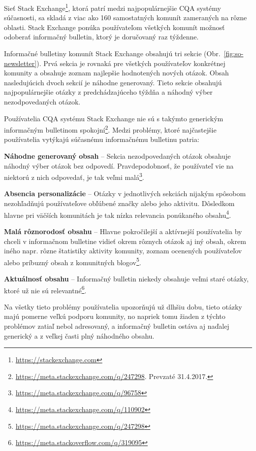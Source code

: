 Sieť Stack Exchange\footnote{ \url{https://stackexchange.com}}, ktorá patrí medzi najpopulárnejšie CQA systémy súčasnosti,
sa skladá z viac ako 160 samostatných komunít zameraných na rôzne oblasti. Stack Exchange ponúka používateľom všetkých
komunít možnosť odoberať informačný bulletin, ktorý je doručovaný raz týždenne.

Informačné bulletiny komunít Stack Exchange obsahujú tri sekcie (Obr.~\ref{fig:so-newsletter}). Prvá sekcia je rovnaká
pre všetkých používateľov konkrétnej komunity a obsahuje zoznam najlepšie hodnotených nových otázok.
Obsah nasledujúcich dvoch sekcií je náhodne generovaný. Tieto sekcie obsahujú najpopulárnejšie otázky z predchádzajúceho
týždňa a náhodný výber nezodpovedaných otázok.

Používatelia CQA systému Stack Exchange nie sú s takýmto generickým informačným bulletinom
spokojní\footnote{\url{https://meta.stackexchange.com/q/247298}. Prevzaté 31.4.2017.}. Medzi problémy, ktoré najčastejšie
používatelia vytýkajú súčasnému informačnému bulletinu patria:

\begin{my_itemize}
  \item{\textbf{Náhodne generovaný obsah} -- Sekcia nezodpovedaných otázok obsahuje náhodný výber otázok bez odpovedí.
        Pravdepodobnosť, že používateľ vie na niektorú z nich odpovedať, je tak veľmi
        malá\footnote{\url{https://meta.stackexchange.com/q/96758}}.}
  \item{\textbf{Absencia personalizácie} -- Otázky v jednotlivých sekciách nijakým spôsobom nezohľadňujú používateľove
        obľúbené značky alebo jeho aktivitu. Dôsledkom hlavne pri väčších komunitách je tak nízka relevancia ponúkaného
        obsahu\footnote{\url{https://meta.stackexchange.com/q/110902}}.}
  \item{\textbf{Malá rôznorodosť obsahu} -- Hlavne pokročilejší a aktívnejší používatelia by chceli v informačnom bulletine vidieť
        okrem rôznych otázok aj iný obsah, okrem iného napr. rôzne štatistiky aktivity komunity, zoznam ocenených používateľov
        alebo príbuzný obsah z komunitných blogov\footnote{\url{https://meta.stackexchange.com/q/247298}}.}
  \item{\textbf{Aktuálnosť obsahu} -- Informačný bulletin niekedy obsahuje veľmi staré otázky, ktoré už nie sú
  relevantné\footnote{\url{https://meta.stackoverflow.com/q/319095}}.}
\end{my_itemize}

Na všetky tieto problémy používatelia upozorňujú už dlhšiu dobu, tieto otázky majú pomerne veľkú podporu komunity,
no napriek tomu žiaden z týchto problémov zatiaľ nebol adresovaný, a informačný bulletin ostáva aj naďalej generický
a z veľkej časti plný náhodného obsahu.


